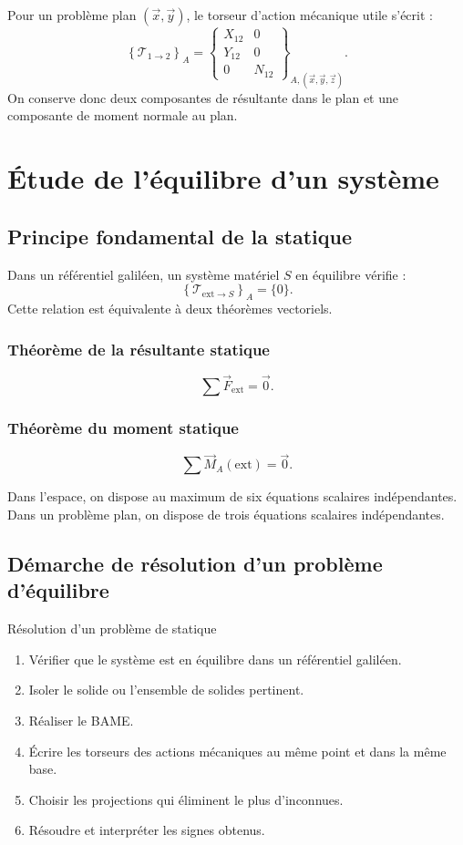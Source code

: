 Pour un problème plan $(\vec x,\vec y)$, le torseur d'action mécanique utile s'écrit :
\[
\left\{\mathcal T_{1\rightarrow2}\right\}_A=
\left\{
\begin{array}{cc}
X_{12} & 0\\
Y_{12} & 0\\
0 & N_{12}
\end{array}
\right\}_{A,(\vec x,\vec y,\vec z)}.
\]
On conserve donc deux composantes de résultante dans le plan et une composante de moment normale au plan.

\section{Étude de l'équilibre d'un système}

\subsection{Principe fondamental de la statique}

Dans un référentiel galiléen, un système matériel $S$ en équilibre vérifie :
\[
\left\{\mathcal T_{\mathrm{ext}\rightarrow S}\right\}_A=\{0\}.
\]
Cette relation est équivalente à deux théorèmes vectoriels.

\subsubsection{Théorème de la résultante statique}
\[
\sum \vec F_{\mathrm{ext}}=\vec 0.
\]

\subsubsection{Théorème du moment statique}
\[
\sum \vec M_A(\mathrm{ext})=\vec 0.
\]

Dans l'espace, on dispose au maximum de six équations scalaires indépendantes. Dans un problème plan, on dispose de trois équations scalaires indépendantes.

\subsection{Démarche de résolution d'un problème d'équilibre}

\TLChaineResolutionStatique

\begin{TLMethod}{Résolution d'un problème de statique}
\begin{enumerate}
  \item Vérifier que le système est en équilibre dans un référentiel galiléen.
  \item Isoler le solide ou l'ensemble de solides pertinent.
  \item Réaliser le BAME.
  \item Écrire les torseurs des actions mécaniques au même point et dans la même base.
  \item Choisir les projections qui éliminent le plus d'inconnues.
  \item Résoudre et interpréter les signes obtenus.
\end{enumerate}
\end{TLMethod}

